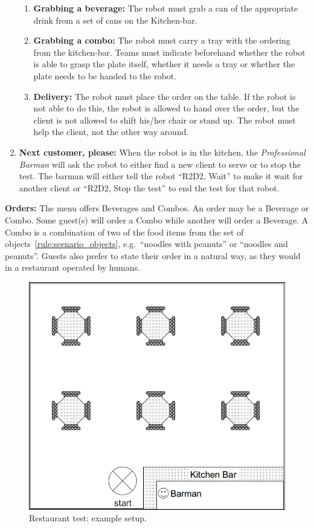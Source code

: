 \begin{enumerate}
\begin{enumerate}
		\item \textbf{Grabbing a beverage:} The robot must grab a can of the appropriate drink from a set of cans on the Kitchen-bar.

		\item \textbf{Grabbing a combo:}  The robot must carry a tray with the ordering from the kitchen-bar.
		Teams must indicate beforehand whether the robot is able to grasp the plate itself, whether it needs a tray or whether the plate needs to be handed to the robot.

		\item \textbf{Delivery:} The robot must place the order on the table.
		If the robot is not able to do this, the robot is allowed to hand over the order, but the client is not allowed to shift his/her chair or stand up.
		The robot must help the client, not the other way around.
	\end{enumerate}

	\item \textbf{Next customer, please:} When the robot is in the kitchen, the \textit{Professional Barman} will ask the robot to either find a new client to serve or to stop the test.
	The barman will either tell the robot \enquote{R2D2, Wait} to make it wait for another client or \enquote{R2D2, Stop the test} to end the test for that robot.
\end{enumerate}

\textbf{Orders:} The menu offers Beverages and Combos. An order may be a Beverage or Combo. Some guest(s) will order a Combo while another will order a Beverage.
  A Combo is a combination of two of the food items from the set of objects~\ref{rule:scenario_objects}, e.g.~\enquote{noodles with peanuts} or \enquote{noodles and peanuts}.
  Guests also prefer to state their order in a natural way, as they would in a restaurant operated by humans.

\begin{figure}[tbp]
	\centering
	\includegraphics[width=0.5\columnwidth]{images/restaurant.png}
	\caption{Restaurant test: example setup.}
	\label{fig:restaurant}
\end{figure}

